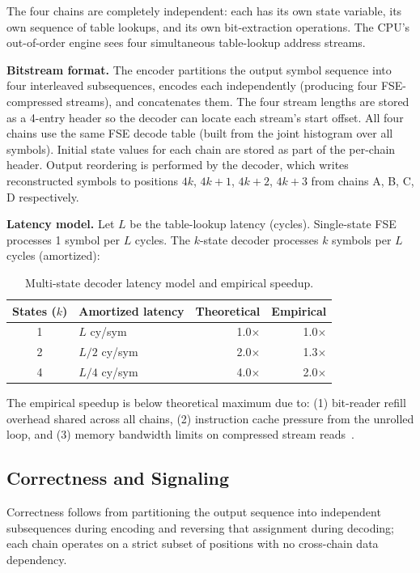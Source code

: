 \documentclass[journal]{IEEEtran}
\begin{document}
The four chains are completely independent: each has its own state variable, its
own sequence of table lookups, and its own bit-extraction operations. The CPU's
out-of-order engine sees four simultaneous table-lookup address streams.

\textbf{Bitstream format.} The encoder partitions the output symbol sequence
into four interleaved subsequences, encodes each independently (producing four
FSE-compressed streams), and concatenates them. The four stream lengths are
stored as a 4-entry header so the decoder can locate each stream's start
offset. All four chains use the same FSE decode table (built from the joint
histogram over all symbols). Initial state values for each chain are stored as
part of the per-chain header. Output reordering is performed by the decoder,
which writes reconstructed symbols to positions $4k$, $4k+1$, $4k+2$, $4k+3$
from chains A, B, C, D respectively.

\textbf{Latency model.} Let $L$ be the table-lookup latency (cycles).
Single-state FSE processes 1 symbol per $L$ cycles. The $k$-state decoder
processes $k$ symbols per $L$ cycles (amortized):

\begin{table}[htbp]
\centering
\caption{Multi-state decoder latency model and empirical speedup.}
\label{tab:latency}
\begin{tabular}{clrr}
\toprule
States ($k$) & Amortized latency & Theoretical & Empirical \\
\midrule
1 & $L$ cy/sym & 1.0$\times$ & 1.0$\times$ \\
2 & $L/2$ cy/sym & 2.0$\times$ & 1.3$\times$ \\
4 & $L/4$ cy/sym & 4.0$\times$ & 2.0$\times$ \\
\bottomrule
\end{tabular}
\end{table}

The empirical speedup is below theoretical maximum due to: (1) bit-reader
refill overhead shared across all chains, (2) instruction cache pressure from
the unrolled loop, and (3) memory bandwidth limits on compressed stream
reads~\cite{williams2009}.

\subsection{Correctness and Signaling}
\label{sec:signaling}

Correctness follows from partitioning the output sequence into independent
subsequences during encoding and reversing that assignment during decoding;
each chain operates on a strict subset of positions with no cross-chain data
dependency.
\end{document}
